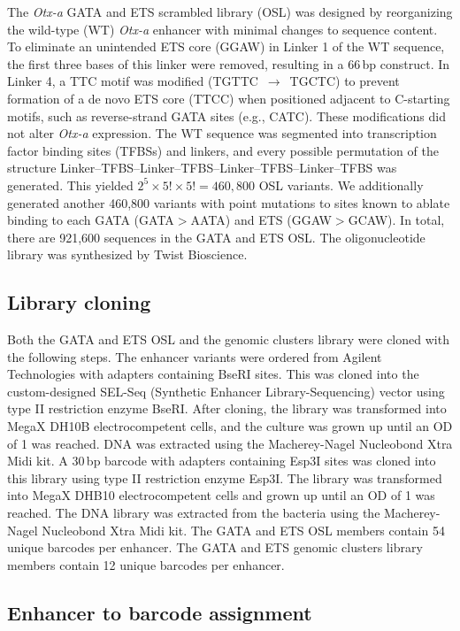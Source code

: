 The \textit{Otx-a} GATA and ETS scrambled library (OSL) was designed by reorganizing the wild-type (WT) \textit{Otx-a} enhancer with minimal changes to sequence content. To eliminate an unintended ETS core (GGAW) in Linker 1 of the WT sequence, the first three bases of this linker were removed, resulting in a 66\,bp construct. In Linker 4, a TTC motif was modified (TGTTC~$\rightarrow$~TGCTC) to prevent formation of a de novo ETS core (TTCC) when positioned adjacent to C-starting motifs, such as reverse-strand GATA sites (e.g., CATC). These modifications did not alter \textit{Otx-a} expression. The WT sequence was segmented into transcription factor binding sites (TFBSs) and linkers, and every possible permutation of the structure Linker–TFBS–Linker–TFBS–Linker–TFBS–Linker–TFBS was generated. This yielded $2^5 \times 5! \times 5! = 460{,}800$ OSL variants. We additionally generated another 460,800 variants with point mutations to sites known to ablate binding to each GATA (GATA$>$AATA)\cite{Bertrand2003-su} and ETS (GGAW$>$GCAW)\cite{Woznica2012-jd,Schachterle2012-kq}. In total, there are 921,600 sequences in the GATA and ETS OSL. The oligonucleotide library was synthesized by Twist Bioscience.

\subsection{Library cloning}

Both the GATA and ETS OSL and the genomic clusters library were cloned with the following steps. The enhancer variants were ordered from Agilent Technologies with adapters containing BseRI sites. This was cloned into the custom-designed SEL-Seq (Synthetic Enhancer Library-Sequencing) vector using type II restriction enzyme BseRI\cite{Farley2016-eh}. After cloning, the library was transformed into MegaX DH10B electrocompetent cells, and the culture was grown up until an OD of 1 was reached. DNA was extracted using the Macherey-Nagel Nucleobond Xtra Midi kit. A 30\,bp barcode with adapters containing Esp3I sites was cloned into this library using type II restriction enzyme Esp3I. The library was transformed into MegaX DHB10 electrocompetent cells and grown up until an OD of 1 was reached. The DNA library was extracted from the bacteria using the Macherey-Nagel Nucleobond Xtra Midi kit. The GATA and ETS OSL members contain 54 unique barcodes per enhancer. The GATA and ETS genomic clusters library members contain 12 unique barcodes per enhancer.

\subsection{Enhancer to barcode assignment}

